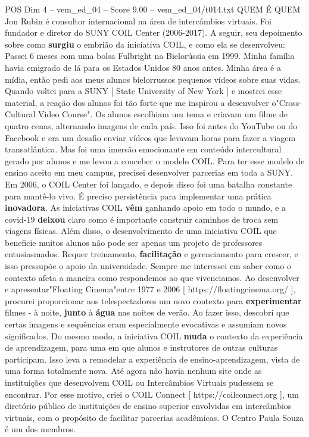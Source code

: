 \begin{textsample}{POS Dim 4 – vem\_ed\_04 – Score 9.00 – vem\_ed\_04/t014.txt}  \label{ex:f4_pos_059}
QUEM É QUEM Jon Rubin é consultor internacional na área de intercâmbios virtuais.
Foi fundador e diretor do SUNY COIL Center (2006-2017).
A seguir, seu depoimento sobre como \textbf{surgiu} o embrião da iniciativa COIL, e como ela se desenvolveu: Passei 6 meses com uma bolsa Fulbright na Bielorússia em 1999.
Minha família havia emigrado de lá para os Estados Unidos 80 anos antes.
Minha área é a mídia, então pedi aos meus alunos bielorrussos pequenos vídeos sobre suas vidas.
Quando voltei para a SUNY [ State University of New York ] e mostrei esse material, a reação dos alunos foi tão forte que me inspirou a desenvolver o"Cross-Cultural Video Course".
Os alunos escolhiam um tema e criavam um filme de quatro cenas, alternando imagens de cada país.
Isso foi antes do YouTube ou do Facebook e era um desafio enviar vídeos que levavam horas para fazer a viagem transatlântica.
Mas foi uma imersão emocionante em conteúdo intercultural gerado por alunos e me levou a conceber o modelo COIL.
Para ter esse modelo de ensino aceito em meu campus, precisei desenvolver parcerias em toda a SUNY.
Em 2006, o COIL Center foi lançado, e depois disso foi uma batalha constante para mantê-lo vivo.
É preciso persistência para implementar uma prática \textbf{inovadora}.
As iniciativas COIL \textbf{vêm} ganhando apoio em todo o mundo, e a covid-19 \textbf{deixou} claro como é importante construir caminhos de troca sem viagens físicas.
Além disso, o desenvolvimento de uma iniciativa COIL que beneficie muitos alunos não pode ser apenas um projeto de professores entusiasmados.
Requer treinamento, \textbf{facilitação} e gerenciamento para crescer, e isso pressupõe o apoio da universidade.
Sempre me interessei em saber como o contexto afeta a maneira como respondemos ao que vivenciamos.
Ao desenvolver e apresentar"Floating Cinema"entre 1977 e 2006 [ https://floatingcinema.org/ ], procurei proporcionar aos telespectadores um novo contexto para \textbf{experimentar} filmes - à noite, \textbf{junto} à \textbf{água} nas noites de verão.
Ao fazer isso, descobri que certas imagens e sequências eram especialmente evocativas e assumiam novos significados.
Do mesmo modo, a iniciativa COIL \textbf{muda} o contexto da experiência de aprendizagem, para uma em que alunos e instrutores de outras culturas participam.
Isso leva a remodelar a experiência de ensino-aprendizagem, vista de uma forma totalmente nova.
Até agora não havia nenhum site onde as instituições que desenvolvem COIL ou Intercâmbios Virtuais pudessem se encontrar.
Por esse motivo, criei o COIL Connect [ https://coilconnect.org ], um diretório público de instituições de ensino superior envolvidas em intercâmbios virtuais, com o propósito de facilitar parcerias acadêmicas.
O Centro Paula Souza é um dos membros.

\end{textsample}
